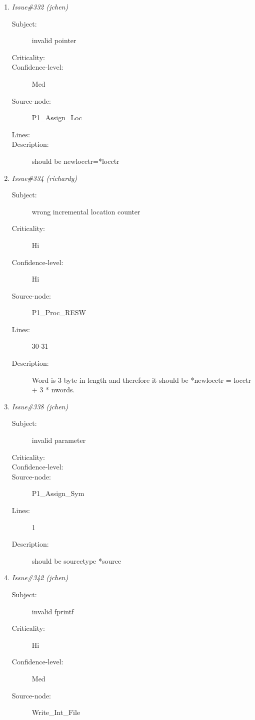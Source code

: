 \begin{enumerate}
\begin{description}
\item [Lines:] 49-50

\item [Description:] before entering this loop, i=8 so this loop never get executed.
\end{description}
\item {\it Issue\#332 (jchen)}
\begin{description}
\item [Subject:] invalid pointer
\item [Criticality:] 
\item [Confidence-level:] Med
\item [Source-node:] P1\_Assign\_Loc

\item [Lines:] 

\item [Description:] should be newlocctr=*locctr
\end{description}
\item {\it Issue\#334 (richardy)}
\begin{description}
\item [Subject:] wrong incremental location counter
\item [Criticality:] Hi
\item [Confidence-level:] Hi
\item [Source-node:] P1\_Proc\_RESW

\item [Lines:] 30-31

\item [Description:] Word is 3 byte in length and therefore it
should be *newlocctr = locctr + 3 * nwords.
\end{description}
\item {\it Issue\#338 (jchen)}
\begin{description}
\item [Subject:] invalid parameter
\item [Criticality:] 
\item [Confidence-level:] 
\item [Source-node:] P1\_Assign\_Sym

\item [Lines:] 1

\item [Description:] should be sourcetype *source
\end{description}
\item {\it Issue\#342 (jchen)}
\begin{description}
\item [Subject:] invalid fprintf
\item [Criticality:] Hi
\item [Confidence-level:] Med
\item [Source-node:] Write\_Int\_File


\end{description}
\end{enumerate}
